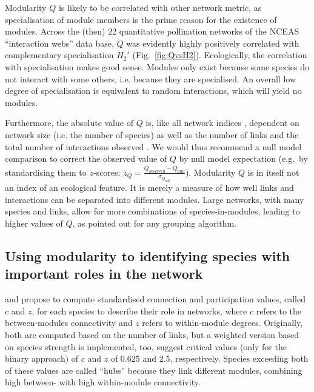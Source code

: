 \documentclass[a4paper, 11pt]{article}\usepackage[]{graphicx}\usepackage[dvipsnames]{xcolor}
\begin{document}
Modularity $Q$ is likely to be correlated with other network metric, as specialisation of module members is the prime reason for the existence of modules. Across the (then) $22$ quantitative pollination networks of the NCEAS ``interaction webs'' data base, %
 $Q$ was evidently highly positively correlated with complementary specialisation $H_2'$ (Fig.~\ref{fig:QvsH2}).
Ecologically, the correlation with specialisation makes good sense. Modules only exist because some species do not interact with some others, i.e. because they are specialised. An overall low degree of specialisation is equivalent to random interactions, which will yield no modules. %

Furthermore, the absolute value of $Q$ is, like all network indices \citep{Dormann2009}, dependent on network size (i.e. the number of species) as well as the number of links and the total number of interactions observed \citep{Thebault2013}. We would thus recommend a null model comparison \citep{Vazquez2003a,Bluthgen2008,Dormann2009} to correct the observed value of $Q$ by null model expectation (e.g.~by standardising them to $z$-scores:
$z_{Q} = \frac{Q_{\text{observed}} - \overline{Q}_{\text{null}}}{\sigma_{Q_{\text{null}}}}$).
%
Modularity $Q$ is in itself not an index of an ecological feature. It is merely a measure of how well links and interactions can be separated into different modules. Large networks, with many species and links, allow for more combinations of species-in-modules, leading to higher values of $Q$, as \citet{Allesina2009a} pointed out for any grouping algorithm. %


\subsection{Using modularity to identifying species with important roles in the network}
\citet{Guimera2005} and \citet{Olesen2007} propose to compute standardised connection and participation values, called $c$ and $z$, for each species to describe their role in networks, where $c$ refers to the between-modules connectivity \citep[called ``participation coefficient'' $P$:][]{Guimera2005} and $z$ refers to within-module degrees. Originally, both are computed based on the number of links, but a weighted version based on species strength is implemented, too. \citet{Guimera2005} suggest critical values (only for the binary approach) of $c$ and $z$ of $0.625$ and $2.5$, respectively. Species exceeding both of these values are called ``hubs'' because they link different modules, combining high between- with high within-module connectivity. 
\end{document}
